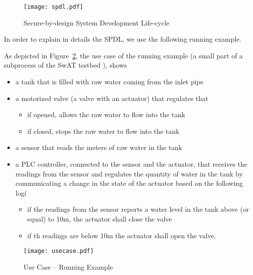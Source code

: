 \begin{figure}[t]
	\centering
	\texttt{[image: spdl.pdf]}
	\caption{Secure-by-design System Development Life-cycle}
	\label{fig:spdl}
\end{figure}

In order to explain in details the SPDL, we use the following running example.
\begin{example}
	As depicted in Figure~\ref{fig:usecase}, the use case of the running example
	(a small part of a subprocess of the SwAT testbed \autocite{Mathur2016swat}), shows
	\begin{itemize}[noitemsep]
		\item a tank that is filled with raw water coming from the inlet pipe 
		\item a motorized valve (a valve with an actuator) that regulates that
			\begin{itemize}
				\item if opened, allows the raw water to flow into the tank
				\item if closed, stops the raw water to flow into the tank
			\end{itemize}
		\item a sensor that reads the meters of raw water in the tank
		\item a PLC controller, connected to the sensor and the actuator, that receives the readings from the sensor and regulates the quantity of water in the tank by communicating a change in the state of the actuator based on the following logi
			\begin{itemize}
				\item if the readings from the sensor reports a water level in the tank above (or equal) to 10m, the actuator shall close the valve
				\item if th readings are below 10m the actuator shall open the valve.
			\end{itemize}
	\end{itemize}

\begin{figure}[t]
	\centering
	\texttt{[image: usecase.pdf]}
	\caption{Use Case -- Running Example}
	\label{fig:usecase}
\end{figure}
\end{example}

